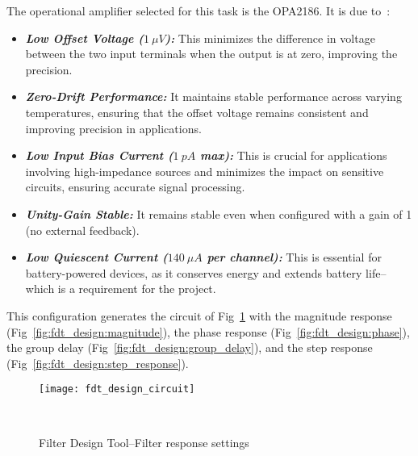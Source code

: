 The operational amplifier selected for this task is the OPA2186. It is due to~\cite{opax186_datasheet}:

\begin{itemize}
    \item \textit{\textbf{Low Offset Voltage ($1~\mu V$):}} This minimizes the difference in voltage between the two input terminals when the output is at zero, improving the precision.

    \item \textit{\textbf{Zero-Drift Performance:}} It maintains stable performance across varying temperatures, ensuring that the offset voltage remains consistent and improving precision in applications.

    \item \textit{\textbf{Low Input Bias Current ($1~pA$ max):}} This is crucial for applications involving high-impedance sources and minimizes the impact on sensitive circuits, ensuring accurate signal processing.

    \item \textit{\textbf{Unity-Gain Stable:}} It remains stable even when configured with a gain of 1 (no external feedback).

    \item \textit{\textbf{Low Quiescent Current ($140~\mu A$ per channel):}} This is essential for battery-powered devices, as it conserves energy and extends battery life--which is a requirement for the project.
\end{itemize}

This configuration generates the circuit of Fig~\ref{fig:fdt_design_circuit} with the magnitude response (Fig~\ref{fig:fdt_design:magnitude}), the phase response (Fig~\ref{fig:fdt_design:phase}), the group delay (Fig~\ref{fig:fdt_design:group_delay}), and the step response (Fig~\ref{fig:fdt_design:step_response}).

\begin{figure}[H]
    \centering
    \texttt{[image: fdt\_design\_circuit]}
    \caption{Filter Design Tool--Filter response settings}
~\label{fig:fdt_design_circuit}
\end{figure}

